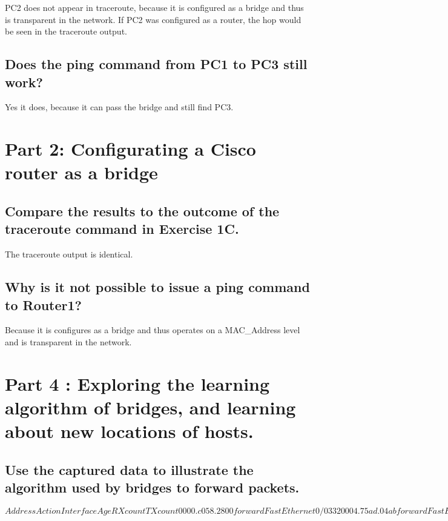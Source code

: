 \documentclass[a4paper, 11pt]{article}
\begin{document}
PC2 does not appear in traceroute, because it is configured as a bridge and thus is transparent in the network. If PC2 was configured as a router, the hop would be seen in the traceroute output.

\subsection{Does the ping command from PC1 to PC3 still work?  }

Yes it does, because it can pass the bridge and still find PC3.

\section{Part 2: Configurating a Cisco router as a bridge}

\subsection{Compare the results to the outcome of the traceroute command in Exercise 1C. }

The traceroute output is identical.

\subsection{Why is it not possible to issue a ping command to Router1? }

Because it is configures as a bridge and thus operates on a MAC_Address level and is transparent in the network.

\section{Part 4 : Exploring the learning algorithm of bridges, and learning about new locations of hosts. }

\subsection{Use the captured data to illustrate the algorithm used by bridges to forward packets.  }

$  Address       Action   Interface       Age   RX count   TX count
0000.c058.2800   forward   FastEthernet0/0   3          3          2
0004.75ad.04ab   forward   FastEthernet0/0   4          1          0
0050.bf75.209a   forward   FastEthernet0/0   4          3          3
0050.bf73.5aab   forward   FastEthernet0/1   3          6          5$
\end{document}
